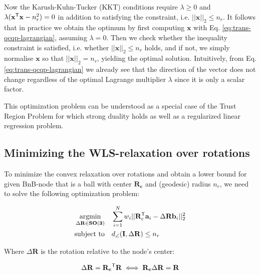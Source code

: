 Now the Karush-Kuhn-Tucker (KKT) conditions require $\lambda \geq 0$ and $\lambda (
\mathbf{x}^{\mathsf{T}} \mathbf{x} - n_r^2) = 0$ in addition to satisfying the constraint, i.e. $|| \mathbf{x}||_2 \leq n_r$. It follows that in practice we obtain the optimum by first computing $\mathbf{x}$ with Eq. \ref{eq:trans-qcqp-lagrangian}, assuming $\lambda = 0$. Then we check whether the inequality constraint is satisfied, i.e. whether $|| \mathbf{x}||_2 \leq n_r$ holds, and if not, we simply normalise $\mathbf{x}$ so that $|| \mathbf{x}||_2 = n_r$, yielding the optimal solution. Intuitively, from Eq. \ref{eq:trans-qcqp-lagrangian} we already see that the direction of the vector does not change regardless of the optimal Lagrange multiplier $\lambda$ since it is only a scalar factor.  

This optimization problem can be understood as a special case of the Trust Region Problem for which strong duality holds \cite[Ch. 5.2, p.229]{Boyd_Vandenberghe_2004} as well as a regularized linear regression problem.



\subsection{Minimizing the WLS-relaxation over rotations}

To minimize the convex relaxation over rotations and obtain a lower bound for given BnB-node that is a ball with center $\mathbf{R_c}$ and (geodesic) radius $n_r$, we need to solve the following optimization problem:

\begin{equation}
	\label{eq:tls-rwls}
	\begin{aligned}
		\operatorname*{argmin}_{\Delta \mathbf{R} \in \mathbf{SO(3)}}  \quad &\sum_{i=1}^{N} w_i ||\mathbf{R}_c^{\mathsf{T}} \mathbf{a}_i - \Delta\mathbf{R} \mathbf{b}_i ||_2^2 \\
		\text{subject to} \quad &d_{\angle}(\mathbf{I}, \Delta\mathbf{R}) \leq n_r
	\end{aligned}
\end{equation}

Where $\Delta\mathbf{R}$ is the rotation relative to the node's center: 

\begin{equation}
	\begin{aligned}
		\Delta\mathbf{R} = \mathbf{R_c}^{\mathsf{T}}\mathbf{R} \iff \mathbf{R_c}\Delta\mathbf{R} = \mathbf{R}
	\end{aligned}
\end{equation}

